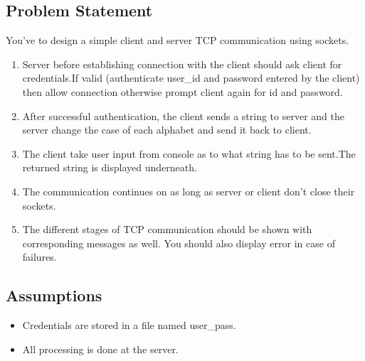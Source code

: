 \documentclass[12pt]{article}
\begin{document}
	
		\subsection{Problem Statement}
		You’ve to design a simple client and server TCP communication using sockets.
		\begin{enumerate}


		\item Server before establishing connection with the client should ask client for credentials.If
		valid (authenticate user\_id and password entered by the client) then allow connection
		otherwise prompt client again for id and password.
		\item After successful authentication, the client sends a string to server and the server change
		the case of each alphabet and send it back to client.
		\item The client take user input from console as to what string has to be sent.The returned
		string is displayed underneath.
		\item The communication continues on as long as server or client don’t close their sockets.
		\item The different stages of TCP communication should be shown with corresponding
		messages as well. You should also display error in case of failures.
		\end{enumerate}		
		
		\subsection{Assumptions}
		
			\begin{itemize}
				\item Credentials are stored in a file named user\_pass.
				\item All processing is done at the server.
			\end{itemize}
		
\end{document}
